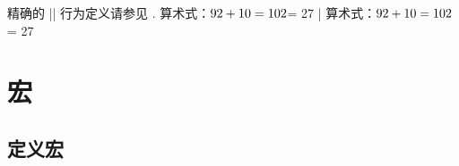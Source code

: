 精确的 |\afterassignment| 行为定义请参见 .
\example
\def\setme{\afterassignment\setmeA\count255}
\def\setmeA{$\number\count255\advance\count255 by 10
   +10=\number{}$}
算术式：\setme = 27
|
\produces
\def\setme{\afterassignment\setmeA\count255}
\def\setmeA{$\number\count255\advance\count255 by 10
   +10=\number{}$}
算术式：\setme = 27
\endexample
\enddesc


\section {宏}

\subsection {定义宏}

